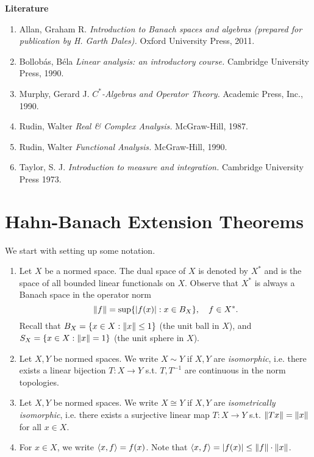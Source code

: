 \documentclass{article}
\begin{document}
\noindent \textbf{Literature}

\begin{enumerate}
    \item Allan, Graham R. \textit{Introduction to Banach spaces and algebras (prepared for publication by H. Garth Dales).} Oxford University Press, 2011.
    \item Bollob\'{a}s, B\'{e}la \textit{Linear analysis: an introductory course.} Cambridge University Press, 1990.
    \item Murphy, Gerard J. \textit{$C^*$-Algebras and Operator Theory.} Academic Press, Inc., 1990.
    \item Rudin, Walter \textit{Real \& Complex Analysis.} McGraw-Hill, 1987.
    \item Rudin, Walter \textit{Functional Analysis.} McGraw-Hill, 1990.
    \item Taylor, S. J. \textit{Introduction to measure and integration.} Cambridge University Press 1973.
\end{enumerate}

\newpage %
\tableofcontents

\newpage 
\section{Hahn-Banach Extension Theorems}

  We start with setting up some notation. 

\begin{enumerate}
    \item Let $X$ be a normed space. The dual space of $X$ is denoted by $X^*$ and is the space of all bounded linear functionals on $X$. Observe that $X^*$ is always a Banach space in the operator norm
    $$\left\lVert f\right\rVert = \sup\{|f(x)|: x\in B_{X}\}, \quad f \in X^{*}.$$
    Recall that $B_{X} = \{x \in X : \left\lVert x\right\rVert \leq 1\}$ (the unit ball in $X$), and $S_{X} = \{x \in X : \left\lVert x\right\rVert = 1\}$ (the unit sphere in $X$). 
    \item Let $X, Y$ be normed spaces. We write
    $X\sim Y$ if $X, Y$ are \textit{isomorphic}, i.e. there exists a linear bijection $T:X\to Y$ s.t. $T, T^{-1}$ are continuous in the norm topologies.
    \item Let $X, Y$ be normed spaces. We write
    $X\cong Y$ if $X, Y$ are \textit{isometrically isomorphic}, i.e. there exists a surjective linear map $T:X\to Y$ s.t. $\left\lVert Tx\right\rVert=\left\lVert x\right\rVert$ for all $x\in X$.
    \item For $x\in X$, we write $\langle x, f\rangle = f(x)$. Note that $\langle x, f\rangle = |f(x)|\leq \left\lVert f\right\rVert\cdot\left\lVert x\right\rVert$.
\end{enumerate}
\end{document}
